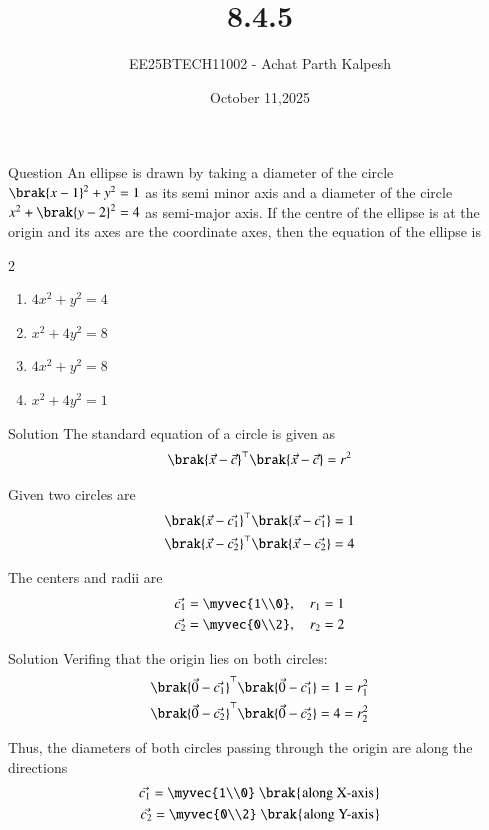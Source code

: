 \documentclass{beamer}
\title %
{8.4.5}
\date{October 11,2025}
\author %
{EE25BTECH11002 - Achat Parth Kalpesh}
\begin{document}
\frame{\titlepage}

\begin{frame}{Question}
An ellipse is drawn by taking a diameter of the circle $\brak{x-1}^2+y^2=1$ as its semi minor axis and a diameter of the circle $x^2+\brak{y-2}^2=4$ as semi-major axis. If the centre of the ellipse is at the origin and its axes are the coordinate axes, then the equation of the ellipse is 
\begin{multicols}{2}
\begin{enumerate}
    \item $4x^2+y^2=4$ 
    \item $x^2+4y^2=8$
    \item $4x^2+y^2=8$
    \item $x^2+4y^2=1$
\end{enumerate}
\end{multicols}
\end{frame}

\begin{frame}{Solution}
The standard equation of a circle is given as
\begin{align}
    \brak{\vec{x}-\vec{c}}^\top\brak{\vec{x}-\vec{c}} = r^2
\end{align}

Given two circles are
\begin{align}
    \brak{\vec{x}-\vec{c_1}}^\top\brak{\vec{x}-\vec{c_1}} = 1\\
    \brak{\vec{x}-\vec{c_2}}^\top\brak{\vec{x}-\vec{c_2}} = 4
\end{align}

The centers and radii are
\begin{align}
    \vec{c_1} = \myvec{1\\0}, \quad r_1 = 1\\
    \vec{c_2} = \myvec{0\\2}, \quad r_2 = 2
\end{align}
\end{frame}



\begin{frame}{Solution}
Verifing that the origin lies on both circles:
\begin{align}
    \brak{\vec{0}-\vec{c_1}}^\top\brak{\vec{0}-\vec{c_1}} = 1 = r_1^2\\
    \brak{\vec{0}-\vec{c_2}}^\top\brak{\vec{0}-\vec{c_2}} = 4 = r_2^2
\end{align}

Thus, the diameters of both circles passing through the origin are along the directions
\begin{align}
    \vec{c_1} = \myvec{1\\0} \text{ \brak{\text{along X-axis}}}\\
    \vec{c_2} = \myvec{0\\2} \text{ \brak{\text{along Y-axis}}}
\end{align}
\end{frame}
\end{document}

